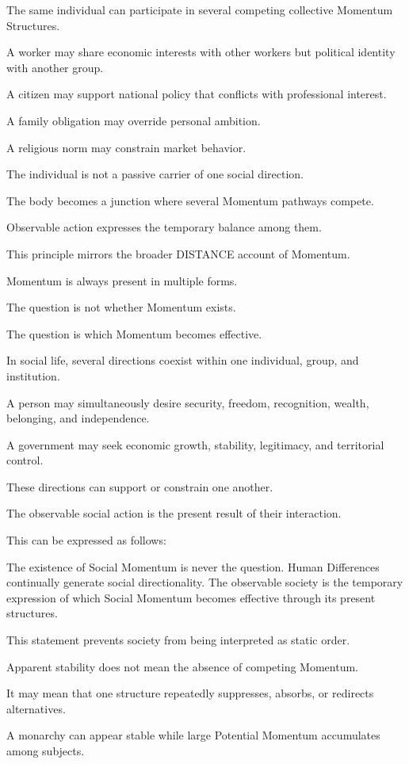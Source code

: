 The same individual can participate in several competing collective Momentum Structures.

A worker may share economic interests with other workers but political identity with another group.

A citizen may support national policy that conflicts with professional interest.

A family obligation may override personal ambition.

A religious norm may constrain market behavior.

The individual is not a passive carrier of one social direction.

The body becomes a junction where several Momentum pathways compete.

Observable action expresses the temporary balance among them.

This principle mirrors the broader DISTANCE account of Momentum.

Momentum is always present in multiple forms.

The question is not whether Momentum exists.

The question is which Momentum becomes effective.

In social life, several directions coexist within one individual, group, and institution.

A person may simultaneously desire security, freedom, recognition, wealth, belonging, and independence.

A government may seek economic growth, stability, legitimacy, and territorial control.

These directions can support or constrain one another.

The observable social action is the present result of their interaction.

This can be expressed as follows:

The existence of Social Momentum is never the question. Human Differences continually generate social directionality. The observable society is the temporary expression of which Social Momentum becomes effective through its present structures.

This statement prevents society from being interpreted as static order.

Apparent stability does not mean the absence of competing Momentum.

It may mean that one structure repeatedly suppresses, absorbs, or redirects alternatives.

A monarchy can appear stable while large Potential Momentum accumulates among subjects.

